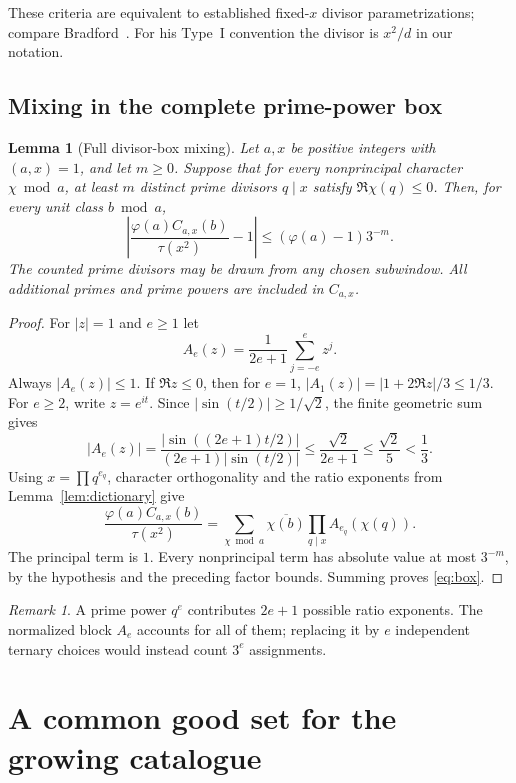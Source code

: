 \documentclass[11pt]{article}
\newtheorem{lemma}[theorem]{Lemma}
\theoremstyle{remark}\newtheorem{remark}[theorem]{Remark}
\begin{document}
These criteria are equivalent to established fixed-$x$ divisor
parametrizations; compare Bradford~\cite[Propositions~1--4]{Bradford}.
For his Type~I convention the divisor is $x^2/d$ in our notation.


\subsection{Mixing in the complete prime-power box}
\begin{lemma}[Full divisor-box mixing]\label{lem:box}
Let $a,x$ be positive integers with $(a,x)=1$, and let $m\ge0$.
Suppose that for every nonprincipal character
$\chi\bmod a$, at least $m$ distinct prime divisors $q\mid x$ satisfy
$\Re\chi(q)\le0$. Then, for every unit class $b\bmod a$,
\begin{equation}\label{eq:box}
 \left|\frac{\varphi(a)C_{a,x}(b)}{\tau(x^2)}-1\right|
 \le(\varphi(a)-1)3^{-m}.
\end{equation}
The counted prime divisors may be drawn from any chosen subwindow.
All additional primes and prime powers are included in $C_{a,x}$.
\end{lemma}
\begin{proof}
For $|z|=1$ and $e\ge1$ let
\[
 A_e(z)=\frac1{2e+1}\sum_{j=-e}^e z^j.
\]
Always $|A_e(z)|\le1$. If $\Re z\le0$, then for $e=1$,
$|A_1(z)|=|1+2\Re z|/3\le1/3$.
For $e\ge2$, write $z=e^{it}$. Since
$|\sin(t/2)|\ge1/\sqrt2$, the finite geometric sum gives
\[
 |A_e(z)|
 =\frac{|\sin((2e+1)t/2)|}{(2e+1)|\sin(t/2)|}
 \le\frac{\sqrt2}{2e+1}\le\frac{\sqrt2}{5}<\frac13.
\]
Using $x=\prod q^{e_q}$, character orthogonality and the ratio exponents
from Lemma~\ref{lem:dictionary} give
\[
 \frac{\varphi(a)C_{a,x}(b)}{\tau(x^2)}
 =\sum_{\chi\bmod a}\overline{\chi(b)}
              \prod_{q\mid x}A_{e_q}(\chi(q)).
\]
The principal term is $1$. Every nonprincipal term has absolute value
at most $3^{-m}$, by the hypothesis and the preceding factor bounds.
Summing proves \eqref{eq:box}.
\end{proof}

\begin{remark}
A prime power $q^e$ contributes $2e+1$ possible ratio exponents.
The normalized block $A_e$ accounts for all of them; replacing it by
$e$ independent ternary choices would instead count $3^e$ assignments.
\end{remark}

\section{A common good set for the growing catalogue}\label{sec:good}
\end{document}
